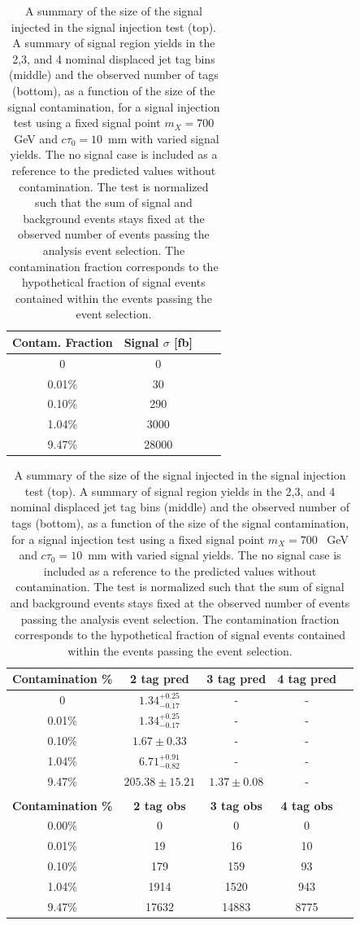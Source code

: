 \begin{table}[tb]
  \caption{A summary of the size of the signal injected in the signal injection test (top).
    A summary of signal region yields in the 2,3, and 4 nominal displaced jet tag bins (middle) and  the
    observed number of tags (bottom), as a function of the
    size of the signal contamination, for a signal injection test using a fixed
    signal point $m_{X} = 700$ ~GeV and $c\tau_0 = 10$~mm with
    varied signal yields. The no signal case is included as a reference to 
    the predicted values without contamination. The test is normalized such that the sum of signal and background
     events stays fixed at the observed number of events passing the analysis event selection.
    The contamination fraction corresponds to the hypothetical fraction of signal events contained within
     the events passing the event selection.  
    \label{tab:700_injection_summary_norm}}
\begin{center}
\begin{tabular}{cccc}
\textbf{Contam. Fraction} & \textbf{Signal} $\sigma$ [fb] \\ 
\hline
 0 & 0 \\
 0.01\% & 30 \\
 0.10\% & 290 \\
 1.04\% & 3000 \\
 9.47\% & 28000 \\
\end{tabular} 
\begin{tabular}{ccccc}
\textbf{Contamination \%} & \textbf{2 tag pred} & \textbf{3 tag pred} &\textbf{4 tag pred} \\
\hline
 0 &  $1.34^{+0.25}_{-0.17}$ & - & - \\ 
 0.01\% & $1.34^{+0.25}_{-0.17}$ & - & - \\
 0.10\% & $1.67\pm0.33$ & - & - \\
 1.04\% & $6.71^{+0.91}_{-0.82}$ &- & - \\
 9.47\% & $205.38\pm15.21$ & $1.37\pm0.08$ & - \\ 
\\
\textbf{Contamination \%} &  \textbf{2 tag obs} & \textbf{3 tag obs} & \textbf{4 tag obs} \\
\hline
0.00\% & 0 & 0 & 0 \\
0.01\% &  19 & 16 & 10 \\ 
0.10\% &  179 & 159 & 93 \\
1.04\% &  1914 & 1520 & 943   \\
9.47\% &  17632  & 14883 & 8775   \\
\end{tabular} 
\end{center}
\end{table}

